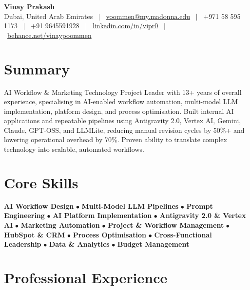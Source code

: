 \documentclass[10.5pt,a4paper]{article}
\begin{document}
\begin{center}
{\LARGE\bfseries Vinay Prakash}\\[0.3em]
\small Dubai, United Arab Emirates \ $|$ \ 
\href{mailto:voommen@my.madonna.edu}{voommen@my.madonna.edu} \ $|$ \ 
+971 58 595 1173 \ $|$ \ 
+91 9645591928 \ $|$ \ 
\href{https://linkedin.com/in/vipr0}{linkedin.com/in/vipr0} \ $|$ \ 
\href{https://behance.net/vinaypoommen}{behance.net/vinaypoommen}
\end{center}
\vspace{-6pt}

\section{Summary}
\small{AI Workflow \& Marketing Technology Project Leader with 13+ years of overall experience, specialising in AI-enabled workflow automation, multi-model LLM implementation, platform design, and process optimisation. Built internal AI applications and repeatable pipelines using Antigravity 2.0, Vertex AI, Gemini, Claude, GPT-OSS, and LLMLite, reducing manual revision cycles by 50\%+ and lowering operational overhead by 70\%. Proven ability to translate complex technology into scalable, automated workflows.}

\section{Core Skills}
\small{\textbf{AI Workflow Design} $\bullet$ \textbf{Multi-Model LLM Pipelines} $\bullet$ \textbf{Prompt Engineering} $\bullet$ \textbf{AI Platform Implementation} $\bullet$ \textbf{Antigravity 2.0 \& Vertex AI} $\bullet$ \textbf{Marketing Automation} $\bullet$ \textbf{Project \& Workflow Management} $\bullet$ \textbf{HubSpot \& CRM} $\bullet$ \textbf{Process Optimisation} $\bullet$ \textbf{Cross-Functional Leadership} $\bullet$ \textbf{Data \& Analytics} $\bullet$ \textbf{Budget Management}}

\section{Professional Experience}
\end{document}

